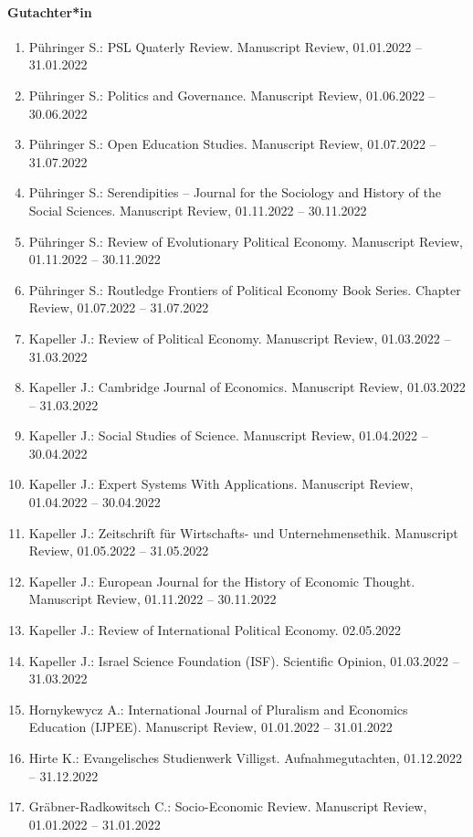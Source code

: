 \paragraph{Gutachter*in}
\begin{enumerate}[leftmargin=*, labelsep=0.5cm]
\item Pühringer S.: PSL Quaterly Review. Manuscript Review, 01.01.2022 -- 31.01.2022
\item Pühringer S.: Politics and Governance. Manuscript Review, 01.06.2022 -- 30.06.2022
\item Pühringer S.: Open Education Studies. Manuscript Review, 01.07.2022 -- 31.07.2022
\item Pühringer S.: Serendipities -- Journal for the Sociology and History of the Social Sciences. Manuscript Review, 01.11.2022 -- 30.11.2022
\item Pühringer S.: Review of Evolutionary Political Economy. Manuscript Review, 01.11.2022 -- 30.11.2022
\item Pühringer S.: Routledge Frontiers of Political Economy Book Series. Chapter Review, 01.07.2022 -- 31.07.2022
\item Kapeller J.: Review of Political Economy. Manuscript Review, 01.03.2022 -- 31.03.2022
\item Kapeller J.: Cambridge Journal of Economics. Manuscript Review, 01.03.2022 -- 31.03.2022
\item Kapeller J.: Social Studies of Science. Manuscript Review, 01.04.2022 -- 30.04.2022
\item Kapeller J.: Expert Systems With Applications. Manuscript Review, 01.04.2022 -- 30.04.2022
\item Kapeller J.: Zeitschrift für Wirtschafts- und Unternehmensethik. Manuscript Review, 01.05.2022 -- 31.05.2022
\item Kapeller J.: European Journal for the History of Economic Thought. Manuscript Review, 01.11.2022 -- 30.11.2022
\item Kapeller J.: Review of International Political Economy. 02.05.2022
\item Kapeller J.: Israel Science Foundation (ISF). Scientific Opinion, 01.03.2022 -- 31.03.2022
\item Hornykewycz A.: International Journal of Pluralism and Economics Education (IJPEE). Manuscript Review, 01.01.2022 -- 31.01.2022
\item Hirte K.: Evangelisches Studienwerk Villigst. Aufnahmegutachten, 01.12.2022 -- 31.12.2022
\item Gräbner-Radkowitsch C.: Socio-Economic Review. Manuscript Review, 01.01.2022 -- 31.01.2022

\end{enumerate}
